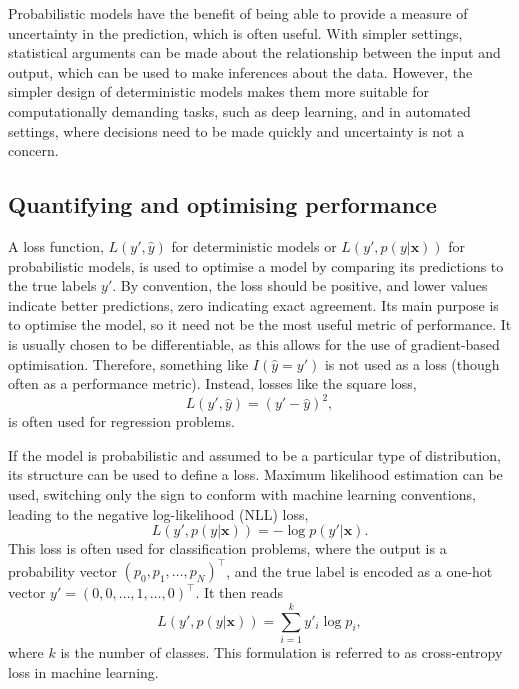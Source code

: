 Probabilistic models have the benefit of being able to provide a measure of uncertainty in the prediction, which is often useful.
With simpler settings, statistical arguments can be made about the relationship between the input and output, which can be used to make inferences about the data.
However, the simpler design of deterministic models makes them more suitable for computationally demanding tasks, such as deep learning, and in automated settings, where decisions need to be made quickly and uncertainty is not a concern.

\subsection{Quantifying and optimising performance}
A loss function, $L(y', \hat{y})$ for deterministic models or $L(y', p(y|\bm{x}))$ for probabilistic models, is used to optimise a model by comparing its predictions to the true labels $y'$.
By convention, the loss should be positive, and lower values indicate better predictions, zero indicating exact agreement.
Its main purpose is to optimise the model, so it need not be the most useful metric of performance.
It is usually chosen to be differentiable, as this allows for the use of gradient-based optimisation.
Therefore, something like $I(\hat y = y')$ is not used as a loss (though often as a performance metric).
Instead, losses like the square loss,
\begin{equation}
    L(y', \hat{y}) = (y' - \hat{y})^2,
\end{equation}
is often used for regression problems.

If the model is probabilistic and assumed to be a particular type of distribution, its structure can be used to define a loss.
Maximum likelihood estimation can be used, switching only the sign to conform with machine learning conventions, leading to the negative log-likelihood (NLL) loss,
\begin{equation}
    L(y', p(y|\bm{x})) = -\log p(y'|\bm{x}).
\end{equation}
This loss is often used for classification problems, where the output is a probability vector $(p_0, p_1, \dots, p_N)^\top$, and the true label is encoded as a one-hot vector $y'=(0, 0, \dots, 1, \dots, 0)^\top$.
It then reads
\begin{equation}
    L(y', p(y|\bm{x})) = \sum_{i=1}^k y'_i \log p_i,
\end{equation}
where $k$ is the number of classes.
This formulation is referred to as cross-entropy loss in machine learning.

